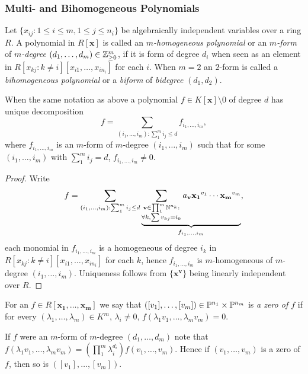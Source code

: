 \subsubsection{Multi- and Bihomogeneous Polynomials}
    \begin{definition}
        Let $\{x_{ij} : 1\leq i\leq m, 1\leq j \leq n_i\}$ be algebraically independent variables over a ring $R$. A polynomial in $R[\mathbf{x}]$ is called an \textit{$m$-homogeneous polynomial} or an \textit{$m$-form} of \textit{$m$-degree} $(d_1,\dots,d_m)\in \mathbb{Z}_{\geq 0}^m$, if it is form of degree $d_i$ when seen as an element in $R[x_{kj} : k\neq i][x_{i1},\dots,x_{in_i}]$ for each $i$. When $m=2$ an $2$-form is called a \textit{bihomogeneous polynomial} or a \textit{biform} of \textit{bidegree} $(d_1,d_2)$.
    \end{definition}
    \begin{lemma}
        When the same notation as above a polynomial $f \in K[\mathbf{x}]\setminus 0$ of degree $d$ has unique decomposition
        $$f = \sum_{(i_1,\dots,i_m): \sum_1^m i_j \leq d} f_{i_1,\dots,i_m},$$
        where $f_{i_1,\dots,i_m}$ is an $m$-form of $m$-degree $(i_1,\dots,i_m)$ such that for some $(i_1,\dots,i_m)$ with $\sum_1^m i_j = d$, $f_{i_1,\dots,i_m}\neq 0$. 
    \end{lemma}
    \begin{proof}
        Write 
        $$f = \sum_{\substack{(i_1,\dots,i_m):\sum_1^m i_j\leq d}} 
        \underbrace{\sum_{\substack{\mathbf{v}\in\prod_1^m \mathbb{N}^{n_k} :\\ \forall k, \sum v_{kj} = i_k}} a_\mathbf{v} \mathbf{x_1}^{v_1}\cdots \mathbf{x_m}^{v_m}}_{f_{i_1,\dots,i_m}},$$
        each monomial in $f_{i_1,\dots,i_m}$ is a homogeneous of degree $i_k$ in $R[x_{kj} : k\neq i][x_{i1},\dots,x_{in_i}]$ for each $k$, hence $f_{i_1,\dots,i_m}$ is $m$-homogeneous of $m$-degree $(i_1,\dots,i_m)$. Uniqueness follows from $\{\mathbf{x}^\mathbf{v}\}$ being linearly independent over $R$.
    \end{proof}
    \begin{definition}
        For an $f\in R[\mathbf{x_1},\dots,\mathbf{x_m}]$ we say that $([v_1],\dots,[v_m])\in \mathbb{P}^{n_1}\times \mathbb{P}^{n_m}$ is \textit{a zero of $f$} if for every $(\lambda_1,\dots,\lambda_m)\in K^m$, $\lambda_i\neq 0$, $f(\lambda_1v_1,\dots,\lambda_mv_m) = 0$.
    \end{definition}
    \begin{remark}
        If $f$ were an $m$-form of $m$-degree $(d_1,\dots,d_m)$ note that $f(\lambda_1v_1,\dots,\lambda_mv_m)=\left(\prod_1^m \lambda_i^{d_i}\right)f(v_1,\dots,v_m)$. Hence if $(v_1,\dots,v_m)$ is a zero of $f$, then so is $([v_1],\dots,[v_m])$.
    \end{remark}
